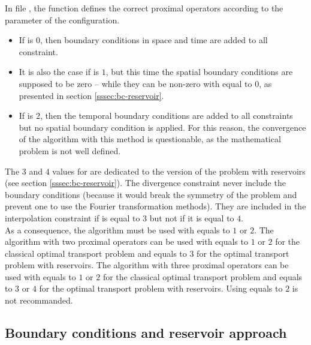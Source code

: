         In file
        , the function  defines the correct proximal
        operators according to the parameter  of the
        configuration.
        \begin{itemize}
            \item If  is $0$, then boundary conditions in space and time are added to all constraint.
            \item It is also the case if  is $1$, but this time the spatial boundary conditions are supposed to be zero
                -- while they can be non-zero with  equal to $0$, as presented in section \ref{sssec:bc-reservoir}.
            \item If  is $2$, then the temporal boundary conditions are added to all constraints but no spatial boundary condition
                is applied. For this reason, the convergence of the algorithm with this method is questionable, as the 
                mathematical problem is not well defined.
        \end{itemize}

        The $3$ and $4$ values for  are dedicated to the version of the problem with reservoirs (see section
        \ref{sssec:bc-reservoir}). The divergence constraint never include the boundary conditions (because it would break
        the symmetry of the problem and prevent one to use the Fourier transformation methods). They are included in the 
        interpolation constraint if  is equal to $3$ but not if it is equal to $4$.\\

        As a consequence, the \pdAlgo{} algorithm must be used with  equals to $1$ or $2$. The
        \drAlgo{} algorithm with two proximal operators 
        can be used with  equals to $1$ or $2$ for the classical optimal transport problem
        and  equals to $3$ for the optimal transport problem with reservoirs.
        The \drAlgo{} algorithm with three proximal operators can be used with  equals 
        to $1$ or $2$ for the classical optimal transport problem and  equals to $3$ or $4$ for 
        the optimal transport problem with reservoirs. Using   equals to $2$ is not recommanded.

    \subsection{Boundary conditions and reservoir approach\label{sssec:bc-reservoir}}
    \noindent
        
